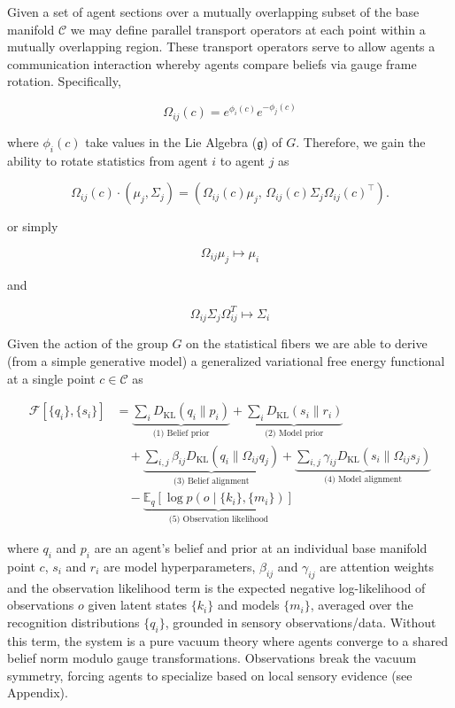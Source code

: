 \documentclass[twoside,11pt]{article}
\begin{document}
Given a set of agent sections over a mutually overlapping subset of the base manifold $\mathcal{C}$ we may define parallel transport operators at each point within a mutually overlapping region.  These transport operators serve to allow agents a communication interaction whereby agents compare beliefs via gauge frame rotation.  Specifically,

$$
\Omega_{ij}(c) = e^{\phi_i(c)}e^{-\phi_j(c)}
$$

where $\phi_i(c)$ take values in the Lie Algebra ($\mathfrak{g}$) of $G$.  Therefore, we gain the ability to rotate statistics from agent $i$ to agent $j$ as


\begin{equation}
\Omega_{ij}(c) \cdot (\mu_j, \Sigma_j) = \left(\Omega_{ij}(c)\mu_j, \, \Omega_{ij}(c)\Sigma_j\Omega_{ij}(c)^\top\right).
\end{equation}

or simply

$$
\Omega_{ij}\mu_j \longmapsto \mu_i
$$

and

$$
\Omega_{ij}\Sigma_j \Omega_{ij}^T \longmapsto \Sigma_i
$$

Given the action of the group $G$ on the statistical fibers we are able to derive (from a simple generative model\cite{Dennis2025}) a generalized variational free energy functional at a single point $c \in \mathcal{C}$ as


\begin{align}
\mathcal{F}[\{q_i\}, \{s_i\}] 
&= \underbrace{\sum_i D_{\mathrm{KL}}(q_i \| p_i)}_{\text{(1) Belief prior}} 
+ \underbrace{\sum_i D_{\mathrm{KL}}(s_i \| r_i)}_{\text{(2) Model prior}} \nonumber \\
&\quad + \underbrace{\sum_{i,j} \beta_{ij} D_{\mathrm{KL}}(q_i \| \Omega_{ij} q_j)}_{\text{(3) Belief alignment}}
+ \underbrace{\sum_{i,j} \gamma_{ij} D_{\mathrm{KL}}(s_i \| {\Omega}_{ij} s_j)}_{\text{(4) Model alignment}} \nonumber \\
&\quad - \underbrace{\mathbb{E}_q[\log p(o \mid \{k_i\}, \{m_i\})]}_{\text{(5) Observation likelihood}}
\label{eq:free_energy_decomposed}
\end{align}

where $q_i$ and $p_i$ are an agent's belief and prior at an individual base manifold point $c$, $s_i$ and $r_i$ are model hyperparameters, $\beta_{ij}$ and $\gamma_{ij}$ are attention weights and the observation likelihood term is the expected negative log-likelihood of observations $o$ given latent states $\{k_i\}$ and models $\{m_i\}$, averaged over the recognition distributions $\{q_i\}$, grounded in sensory observations/data. Without this term, the system is a pure vacuum theory where agents converge to a shared belief norm modulo gauge transformations. Observations break the vacuum symmetry, forcing agents to specialize based on local sensory evidence (see Appendix).
\end{document}
